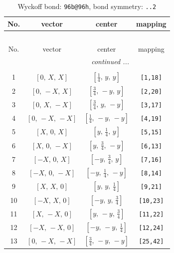 \documentclass[fleqn,8pt]{jsarticle}
\begin{document}
\begin{longtable}{cccc}
\caption{Wyckoff bond: {\tt 96b@96h}, bond symmetry: {\tt ..2}}
 \\
 \hline \hline
No. & vector & center & mapping \\ \hline \endfirsthead

\multicolumn{3}{l}{\tablename\ \thetable{}} \\
 \hline \hline
No. & vector & center & mapping \\ \hline \endhead

 \hline \hline
\multicolumn{3}{r}{\footnotesize\it continued ...} \\ \endfoot

 \hline \hline
\multicolumn{3}{r}{} \\ \endlastfoot

1 & $\left[ 0,\, X,\, X \right]$ & $\left[ \frac{1}{4},\, y,\, y \right]$ & {\tt [1,18]} \\ \hline
2 & $\left[ 0,\, - X,\, X \right]$ & $\left[ \frac{3}{4},\, - y,\, y \right]$ & {\tt [2,20]} \\ \hline
3 & $\left[ 0,\, X,\, - X \right]$ & $\left[ \frac{3}{4},\, y,\, - y \right]$ & {\tt [3,17]} \\ \hline
4 & $\left[ 0,\, - X,\, - X \right]$ & $\left[ \frac{1}{4},\, - y,\, - y \right]$ & {\tt [4,19]} \\ \hline
5 & $\left[ X,\, 0,\, X \right]$ & $\left[ y,\, \frac{1}{4},\, y \right]$ & {\tt [5,15]} \\ \hline
6 & $\left[ X,\, 0,\, - X \right]$ & $\left[ y,\, \frac{3}{4},\, - y \right]$ & {\tt [6,13]} \\ \hline
7 & $\left[ - X,\, 0,\, X \right]$ & $\left[ - y,\, \frac{3}{4},\, y \right]$ & {\tt [7,16]} \\ \hline
8 & $\left[ - X,\, 0,\, - X \right]$ & $\left[ - y,\, \frac{1}{4},\, - y \right]$ & {\tt [8,14]} \\ \hline
9 & $\left[ X,\, X,\, 0 \right]$ & $\left[ y,\, y,\, \frac{1}{4} \right]$ & {\tt [9,21]} \\ \hline
10 & $\left[ - X,\, X,\, 0 \right]$ & $\left[ - y,\, y,\, \frac{3}{4} \right]$ & {\tt [10,23]} \\ \hline
11 & $\left[ X,\, - X,\, 0 \right]$ & $\left[ y,\, - y,\, \frac{3}{4} \right]$ & {\tt [11,22]} \\ \hline
12 & $\left[ - X,\, - X,\, 0 \right]$ & $\left[ - y,\, - y,\, \frac{1}{4} \right]$ & {\tt [12,24]} \\ \hline
13 & $\left[ 0,\, - X,\, - X \right]$ & $\left[ \frac{3}{4},\, - y,\, - y \right]$ & {\tt [25,42]} \\ \hline

\end{longtable}
\end{document}
